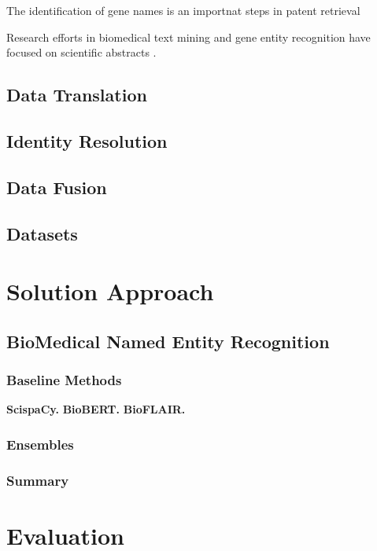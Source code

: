 \documentclass[11pt,titlepage,oneside,openany]{book}
\begin{document}
The identification of gene names is an importnat steps in patent retrieval

Research efforts in biomedical text mining and gene entity recognition have focused on scientific abstracts \cite{RodriguezEsteban2016TextMP}.

\section{Data Translation}

\section{Identity Resolution}

\section{Data Fusion}

\section{Datasets}


\chapter{Solution Approach}
\label{cha:solution}

\section{BioMedical Named Entity Recognition}
\subsection{Baseline Methods}

\textbf{ScispaCy.}
\textbf{BioBERT.}
\textbf{BioFLAIR.}

\subsection{Ensembles}

\subsection{Summary}

\chapter{Evaluation}
\label{cha:evaluation}
\end{document}
